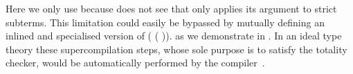 Here we only use \assertTotal{} because \idris{} does not see that
 only applies its argument to strict subterms.
This limitation could easily be bypassed by mutually defining
an inlined and specialised version of
( ( )).
as we demonstrate in .
%
In an ideal type theory these supercompilation steps, whose sole
purpose is to satisfy the totality checker, would be automatically
performed by the compiler~\cite{MANUAL:phd/dublin/Mendel12}.

